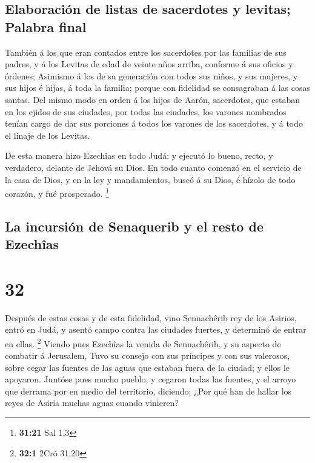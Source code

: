 \hypertarget{elaboraciuxf3n-de-listas-de-sacerdotes-y-levitas-palabra-final}{%
\subsection{Elaboración de listas de sacerdotes y levitas; Palabra
final}\label{elaboraciuxf3n-de-listas-de-sacerdotes-y-levitas-palabra-final}}

 También á los que eran contados entre los sacerdotes por
las familias de sus padres, y á los Levitas de edad de veinte años
arriba, conforme á sus oficios y órdenes;  Asimismo á los
de su generación con todos sus niños, y sus mujeres, y sus hijos é
hijas, á toda la familia; porque con fidelidad se consagraban á las
cosas santas.  Del mismo modo en orden á los hijos de
Aarón, sacerdotes, que estaban en los ejidos de sus ciudades, por todas
las ciudades, los varones nombrados tenían cargo de dar sus porciones á
todos los varones de los sacerdotes, y á todo el linaje de los Levitas.

 De esta manera hizo Ezechîas en todo Judá: y ejecutó lo
bueno, recto, y verdadero, delante de Jehová su Dios.  En
todo cuanto comenzó en el servicio de la casa de Dios, y en la ley y
mandamientos, buscó á su Dios, é hízolo de todo corazón, y fué
prosperado. \footnote{\textbf{31:21} Sal 1,3}

\hypertarget{la-incursiuxf3n-de-senaquerib-y-el-resto-de-ezechuxeeas}{%
\subsection{La incursión de Senaquerib y el resto de
Ezechîas}\label{la-incursiuxf3n-de-senaquerib-y-el-resto-de-ezechuxeeas}}

\hypertarget{section-31}{%
\section{32}\label{section-31}}

 Después de estas cosas y de esta fidelidad, vino
Sennachêrib rey de los Asirios, entró en Judá, y asentó campo contra las
ciudades fuertes, y determinó de entrar en ellas. \footnote{\textbf{32:1}
  2Cró 31,20}  Viendo pues Ezechîas la venida de
Sennachêrib, y su aspecto de combatir á Jerusalem,  Tuvo su
consejo con sus príncipes y con sus valerosos, sobre cegar las fuentes
de las aguas que estaban fuera de la ciudad; y ellos le apoyaron.
 Juntóse pues mucho pueblo, y cegaron todas las fuentes, y
el arroyo que derrama por en medio del territorio, diciendo: ¿Por qué
han de hallar los reyes de Asiria muchas aguas cuando vinieren?

